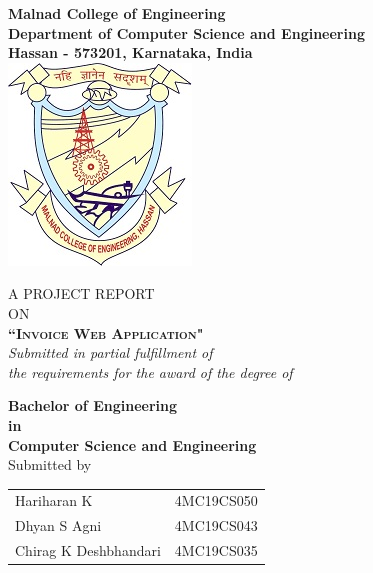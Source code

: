 \begin{titlepage}

\begin{center}
\thispagestyle{empty}
\thisfancypage{%
  \setlength{\fboxsep}{10pt}\doublebox}{}

\vspace*{1\baselineskip}

\LARGE{\textbf{Malnad College of Engineering}} \\ 
\large{\textbf{Department of Computer Science and Engineering}}\\
\large{\textbf{Hassan - 573201, Karnataka, India}}\\[0.5cm]

\includegraphics[scale=0.7]{mce_logo.png}\\[0.5cm]
\vspace{.2in}

\Large{\small{A PROJECT REPORT \\ ON}}\\
\Large{\textsc {\textbf{``Invoice Web Application"}}}\\[0.1cm]
\small \emph{Submitted in partial fulfillment of\\
        the requirements for the award of the degree of}
        \vspace{.2in}

       {\bf Bachelor of Engineering \\in\\ Computer Science and Engineering}\\[0.25cm]

\vspace{.2in}					
\normalsize Submitted by \\
\begin{table}[h]
\centering
\begin{tabular}{lr}
Hariharan K & 4MC19CS050 \\
Dhyan S Agni & 4MC19CS043 \\ 
Chirag K Deshbhandari & 4MC19CS035 \\
\end{tabular}
\end{table}


\end{center}
\end{titlepage}
